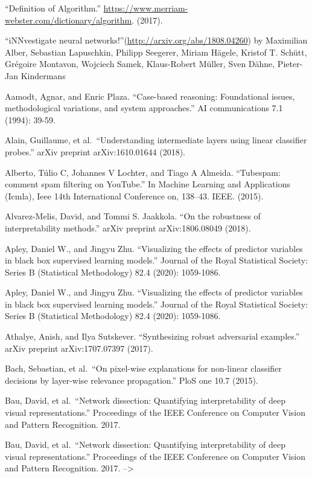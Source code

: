 \documentclass[
  12pt,
]{krantz}
\begin{document}
``Definition of Algorithm.'' \url{https://www.merriam-webster.com/dictionary/algorithm}. (2017).

``iNNvestigate neural networks!''(\url{http://arxiv.org/abs/1808.04260}) by Maximilian Alber, Sebastian Lapuschkin, Philipp Seegerer, Miriam Hägele, Kristof T. Schütt, Grégoire Montavon, Wojciech Samek, Klaus-Robert Müller, Sven Dähne, Pieter-Jan Kindermans

Aamodt, Agnar, and Enric Plaza. ``Case-based reasoning: Foundational issues, methodological variations, and system approaches.'' AI communications 7.1 (1994): 39-59.

Alain, Guillaume, et al.~``Understanding intermediate layers using linear classifier probes.'' arXiv preprint arXiv:1610.01644 (2018).

Alberto, Túlio C, Johannes V Lochter, and Tiago A Almeida. ``Tubespam: comment spam filtering on YouTube.'' In Machine Learning and Applications (Icmla), Ieee 14th International Conference on, 138--43. IEEE. (2015).

Alvarez-Melis, David, and Tommi S. Jaakkola. ``On the robustness of interpretability methods.'' arXiv preprint arXiv:1806.08049 (2018).

Apley, Daniel W., and Jingyu Zhu. ``Visualizing the effects of predictor variables in black box supervised learning models.'' Journal of the Royal Statistical Society: Series B (Statistical Methodology) 82.4 (2020): 1059-1086.

Apley, Daniel W., and Jingyu Zhu. ``Visualizing the effects of predictor variables in black box supervised learning models.'' Journal of the Royal Statistical Society: Series B (Statistical Methodology) 82.4 (2020): 1059-1086.

Athalye, Anish, and Ilya Sutskever. ``Synthesizing robust adversarial examples.'' arXiv preprint arXiv:1707.07397 (2017).

Bach, Sebastian, et al.~``On pixel-wise explanations for non-linear classifier decisions by layer-wise relevance propagation.'' PloS one 10.7 (2015).

Bau, David, et al.~``Network dissection: Quantifying interpretability of deep visual representations.'' Proceedings of the IEEE Conference on Computer Vision and Pattern Recognition. 2017.

Bau, David, et al.~``Network dissection: Quantifying interpretability of deep visual representations.'' Proceedings of the IEEE Conference on Computer Vision and Pattern Recognition. 2017. --\textgreater{}
\end{document}
